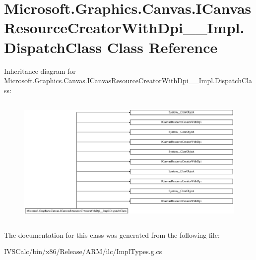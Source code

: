 \hypertarget{class_microsoft_1_1_graphics_1_1_canvas_1_1_i_canvas_resource_creator_with_dpi_____impl_1_1_dispatch_class}{}\section{Microsoft.\+Graphics.\+Canvas.\+I\+Canvas\+Resource\+Creator\+With\+Dpi\+\_\+\+\_\+\+Impl.\+Dispatch\+Class Class Reference}
\label{class_microsoft_1_1_graphics_1_1_canvas_1_1_i_canvas_resource_creator_with_dpi_____impl_1_1_dispatch_class}
Inheritance diagram for Microsoft.\+Graphics.\+Canvas.\+I\+Canvas\+Resource\+Creator\+With\+Dpi\+\_\+\+\_\+\+Impl.\+Dispatch\+Class\+:\begin{figure}[H]
\begin{center}
\leavevmode
\includegraphics[height=6.350515cm]{class_microsoft_1_1_graphics_1_1_canvas_1_1_i_canvas_resource_creator_with_dpi_____impl_1_1_dispatch_class}
\end{center}
\end{figure}


The documentation for this class was generated from the following file\+:\begin{DoxyCompactItemize}
\item 
I\+V\+S\+Calc/bin/x86/\+Release/\+A\+R\+M/ilc/Impl\+Types.\+g.\+cs\end{DoxyCompactItemize}

